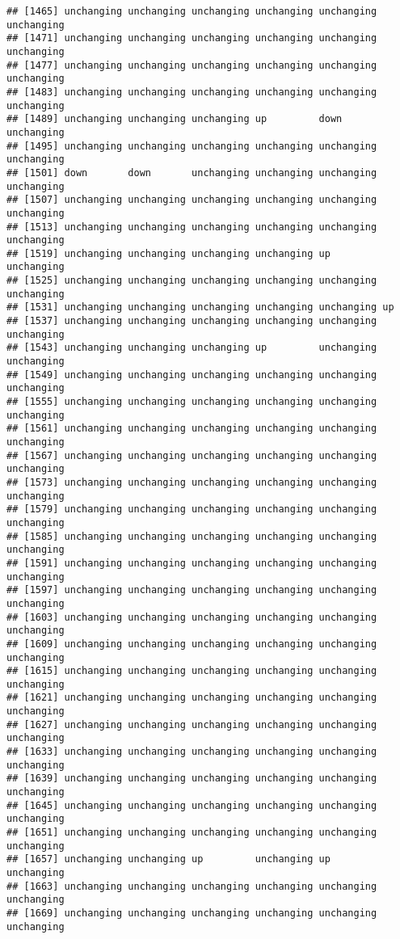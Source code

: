 \documentclass[]{article}
\begin{document}
\begin{verbatim}
## [1465] unchanging unchanging unchanging unchanging unchanging unchanging
## [1471] unchanging unchanging unchanging unchanging unchanging unchanging
## [1477] unchanging unchanging unchanging unchanging unchanging unchanging
## [1483] unchanging unchanging unchanging unchanging unchanging unchanging
## [1489] unchanging unchanging unchanging up         down       unchanging
## [1495] unchanging unchanging unchanging unchanging unchanging unchanging
## [1501] down       down       unchanging unchanging unchanging unchanging
## [1507] unchanging unchanging unchanging unchanging unchanging unchanging
## [1513] unchanging unchanging unchanging unchanging unchanging unchanging
## [1519] unchanging unchanging unchanging unchanging up         unchanging
## [1525] unchanging unchanging unchanging unchanging unchanging unchanging
## [1531] unchanging unchanging unchanging unchanging unchanging up        
## [1537] unchanging unchanging unchanging unchanging unchanging unchanging
## [1543] unchanging unchanging unchanging up         unchanging unchanging
## [1549] unchanging unchanging unchanging unchanging unchanging unchanging
## [1555] unchanging unchanging unchanging unchanging unchanging unchanging
## [1561] unchanging unchanging unchanging unchanging unchanging unchanging
## [1567] unchanging unchanging unchanging unchanging unchanging unchanging
## [1573] unchanging unchanging unchanging unchanging unchanging unchanging
## [1579] unchanging unchanging unchanging unchanging unchanging unchanging
## [1585] unchanging unchanging unchanging unchanging unchanging unchanging
## [1591] unchanging unchanging unchanging unchanging unchanging unchanging
## [1597] unchanging unchanging unchanging unchanging unchanging unchanging
## [1603] unchanging unchanging unchanging unchanging unchanging unchanging
## [1609] unchanging unchanging unchanging unchanging unchanging unchanging
## [1615] unchanging unchanging unchanging unchanging unchanging unchanging
## [1621] unchanging unchanging unchanging unchanging unchanging unchanging
## [1627] unchanging unchanging unchanging unchanging unchanging unchanging
## [1633] unchanging unchanging unchanging unchanging unchanging unchanging
## [1639] unchanging unchanging unchanging unchanging unchanging unchanging
## [1645] unchanging unchanging unchanging unchanging unchanging unchanging
## [1651] unchanging unchanging unchanging unchanging unchanging unchanging
## [1657] unchanging unchanging up         unchanging up         unchanging
## [1663] unchanging unchanging unchanging unchanging unchanging unchanging
## [1669] unchanging unchanging unchanging unchanging unchanging unchanging

\end{verbatim}
\end{document}
